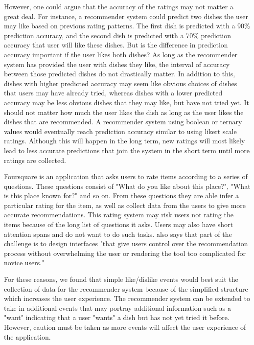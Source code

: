 However, one could argue that the accuracy of the ratings may not matter a great deal. For instance, a recommender system could predict two dishes the user  may like based on previous rating patterns. The first dish is predicted with a 90\% prediction accuracy, and the second dish is predicted with a 70\% prediction accuracy that user will like these dishes. But is the difference in prediction accuracy important if the user likes both dishes? As long as the recommender system has provided the user with dishes they like, the interval of accuracy between those predicted dishes do not drastically matter. In addition to this, dishes with higher predicted accuracy may seem like obvious choices of dishes that users may have already tried, whereas dishes with a lower predicted accuracy may be less obvious dishes that they may like, but have not tried yet. It should not matter how much the user likes the dish as long as the user likes the dishes that are recommended. A recommender system using boolean or ternary values would eventually reach prediction accuracy similar to using likert scale ratings. Although this will happen in the long term, new ratings will most likely lead to less accurate predictions that join the system in the short term until more ratings are collected. 

Foursquare is an application that asks users to rate items according to a series of questions. These questions consist of "What do you like about this place?", "What is this place known for?" and so on. From these questions they are able infer a particular rating for the item, as well as collect data from the users to give more accurate recommendations. This rating system may risk users not rating the items because of the long list of questions it asks. Users may also have short attention spans and do not want to do such tasks. \cite{martin2009recsys} also says that part of the challenge is to design interfaces "that give users control over the recommendation process without overwhelming the user or rendering the tool too complicated for novice users." 

For these reasons, we found that simple like/dislike events would best suit the collection of data for the recommender system because of the simplified structure which increases the user experience. The recommender system can be extended to take in additional events that may portray additional information such as a "want" indicating that a user "wants" a dish but has not yet tried it before. However, caution must be taken as more events will affect the user experience of the application. 


